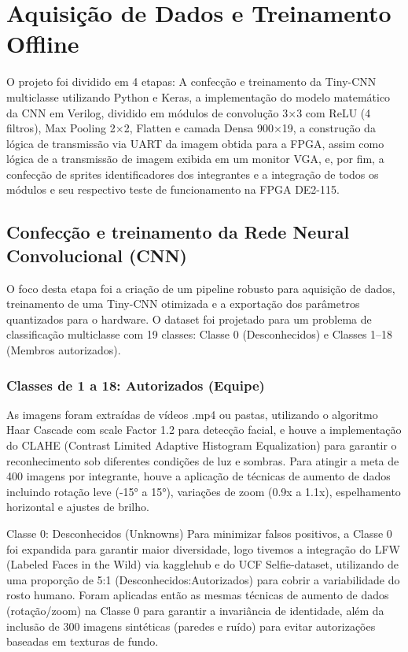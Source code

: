 \chapter{Aquisição de Dados e Treinamento Offline}
O projeto foi dividido em 4 etapas: A confecção e treinamento da Tiny-CNN multiclasse utilizando Python e Keras, a implementação do modelo matemático da CNN em Verilog, dividido em módulos de convolução 3×3 com ReLU (4 filtros), Max Pooling 2×2, Flatten e camada Densa 900×19, a construção da lógica de transmissão via UART da imagem obtida para a FPGA, assim como lógica de a transmissão de imagem exibida em um monitor VGA, e, por fim, a confecção de sprites identificadores dos integrantes e a integração de todos os módulos e seu respectivo teste de funcionamento na FPGA DE2-115.

\section{Confecção e treinamento da Rede Neural Convolucional (CNN)}
O foco desta etapa foi a criação de um pipeline robusto para aquisição de dados, treinamento de uma Tiny-CNN otimizada e a exportação dos parâmetros quantizados para o hardware. O dataset foi projetado para um problema de classificação multiclasse com 19 classes: Classe 0 (Desconhecidos) e Classes 1–18 (Membros autorizados).

\subsection{Classes de 1 a 18: Autorizados (Equipe)}
As imagens foram extraídas de vídeos .mp4 ou pastas, utilizando o algoritmo Haar Cascade com scale Factor 1.2 para detecção facial, e houve a implementação do CLAHE (Contrast Limited Adaptive Histogram Equalization) para garantir o reconhecimento sob diferentes condições de luz e sombras. Para atingir a meta de 400 imagens por integrante, houve a aplicação de técnicas de aumento de dados incluindo rotação leve (-15° a 15°), variações de zoom (0.9x a 1.1x), espelhamento horizontal e ajustes de brilho.

Classe 0: Desconhecidos (Unknowns)
Para minimizar falsos positivos, a Classe 0 foi expandida para garantir maior diversidade, logo tivemos a integração do LFW (Labeled Faces in the Wild) via kagglehub e do UCF Selfie-dataset, utilizando de uma proporção de 5:1 (Desconhecidos:Autorizados) para cobrir a variabilidade do rosto humano. Foram aplicadas então as mesmas técnicas de aumento de dados (rotação/zoom) na Classe 0 para garantir a invariância de identidade, além da inclusão de 300 imagens sintéticas (paredes e ruído) para evitar autorizações baseadas em texturas de fundo.

